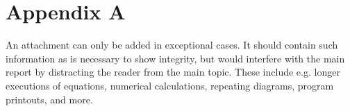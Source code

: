 \chapter{Appendix A}\label{cha:priloga}
An attachment can only be added in exceptional cases. It should contain such information as is necessary to show integrity, but would interfere with the main report by distracting the reader from the main topic. These include e.g. longer executions of equations, numerical calculations, repeating diagrams, program printouts, and more.
